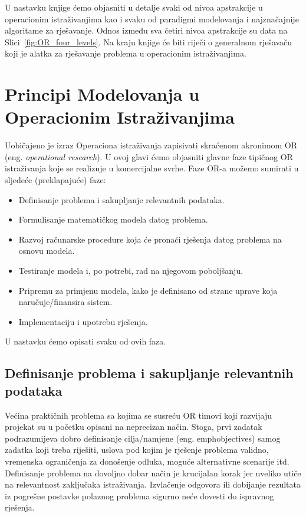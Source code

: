 \documentclass[a4paper, utf8, 11pt, colorlinks]{book}
\begin{document}
U nastavku knjige ćemo objasniti u detalje svaki od nivoa apstrakcije u operacionim istraživanjima kao i svaku od paradigmi modelovanja i najznačajnije algoritame za rješavanje. Odnos između sva četiri nivoa apstrakcije su data na Slici~\ref{fig:OR_four_levels}. 
 Na kraju knjige će biti riječi o generalnom rješavaču koji je alatka za rješavanje problema u operacionim istraživanjima. 
 \\
 \newpage
 
 
\chapter{Principi Modelovanja u Operacionim Istraživanjima}
Uobičajeno je izraz Operaciona istraživanja zapisivati skraćenom akronimom OR (eng. \emph{operational research}). 
U ovoj glavi ćemo objasniti   glavne faze tipičnog OR istraživanja koje se realizuje u  komercijalne svrhe. Faze OR-a možemo sumirati u sljedeće (preklapajuće) faze: 
\begin{itemize}
    \item Definisanje problema i sakupljanje relevantnih podataka.
    \item Formulisanje matematičkog modela datog problema.
    \item Razvoj računarske procedure koja će pronaći rješenja datog problema na osnovu modela.
    \item Testiranje modela i, po potrebi, rad na njegovom poboljšanju.
    \item Pripremu za primjenu modela, kako je definisano od strane uprave koja naručuje/finansira sistem.
    \item Implementaciju i upotrebu rješenja.
\end{itemize}
 U nastavku ćemo opisati svaku od ovih faza.
 
 \section{Definisanje problema i sakupljanje relevantnih podataka}
 
Većina praktičnih problema sa kojima se susreću OR timovi koji razvijaju projekat su u početku opisani na neprecizan način. Stoga, prvi zadatak podrazumijeva dobro definisanje  cilja/namjene  (eng. emph{objectives}) samog zadatka koji treba riješiti, uslova pod kojim je rješenje problema validno,  vremenska ograničenja za donošenje odluka, moguće alternativne scenarije itd.  Definisanje problema na dovoljno dobar način je krucijalan korak jer uveliko utiče na relevantnost zaključaka istraživanja. Izvlačenje odgovora ili dobijanje rezultata iz pogrešne postavke polaznog problema sigurno neće dovesti do ispravnog rješenja.  
\end{document}
